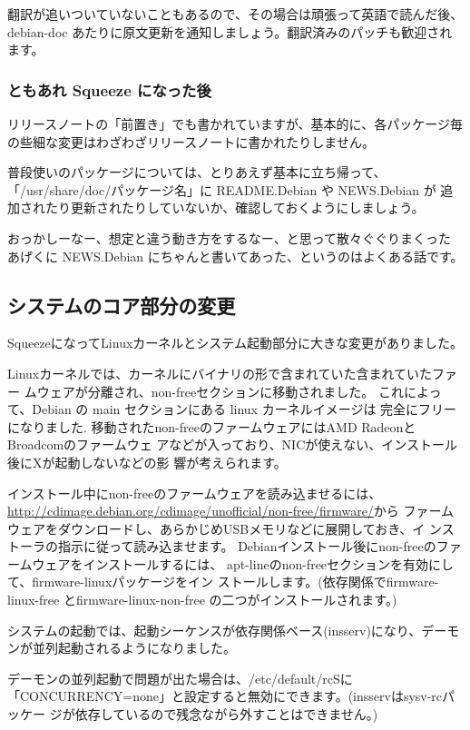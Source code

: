 \documentclass[mingoth,a4paper]{jsarticle}
\begin{document}
翻訳が追いついていないこともあるので、その場合は頑張って英語で読んだ後、
debian-doc あたりに原文更新を通知しましょう。翻訳済みのパッチも歓迎され
ます。

\subsubsection{ともあれ Squeeze になった後}

リリースノートの「前置き」でも書かれていますが、基本的に、各パッケージ毎
の些細な変更はわざわざリリースノートに書かれたりしません。

普段使いのパッケージについては、とりあえず基本に立ち帰って、
「/usr/share/doc/パッケージ名」に README.Debian や NEWS.Debian が
追加されたり更新されたりしていないか、確認しておくようにしましょう。

おっかしーなー、想定と違う動き方をするなー、と思って散々ぐぐりまくった
あげくに NEWS.Debian にちゃんと書いてあった、というのはよくある話です。

\subsection{システムのコア部分の変更}
SqueezeになってLinuxカーネルとシステム起動部分に大きな変更がありました。

Linuxカーネルでは、カーネルにバイナリの形で含まれていた含まれていたファー
ムウェアが分離され、non-freeセクションに移動されました。
これによって、Debian の main セクションにある linux カーネルイメージは
完全にフリーになりました.
%
移動されたnon-freeのファームウェアにはAMD RadeonとBroadcomのファームウェ
アなどが入っており、NICが使えない、インストール後にXが起動しないなどの影
響が考えられます。

インストール中にnon-freeのファームウェアを読み込ませるには、
\url{http://cdimage.debian.org/cdimage/unofficial/non-free/firmware/}から
ファームウェアをダウンロードし、あらかじめUSBメモリなどに展開しておき、イ
ンストーラの指示に従って読み込ませます。
%
Debianインストール後にnon-freeのファームウェアをインストールするには、
apt-lineのnon-freeセクションを有効にして、firmware-linuxパッケージをイン
ストールします。(依存関係でfirmware-linux-free とfirmware-linux-non-free
の二つがインストールされます。)

システムの起動では、起動シーケンスが依存関係ベース(insserv)になり、デーモ
ンが並列起動されるようになりました。

デーモンの並列起動で問題が出た場合は、/etc/default/rcSに
「CONCURRENCY=none」と設定すると無効にできます。(insservはsysv-rcパッケー
ジが依存しているので残念ながら外すことはできません。)
\end{document}
